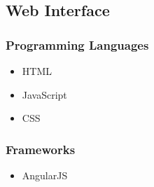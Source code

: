 \documentclass[a4paper,10pt]{article}
\begin{document}
\subsection{Web Interface}
\subsubsection{Programming Languages}
	\begin{itemize}
		\item HTML			
		\item JavaScript			
		\item CSS			
	\end{itemize}

\subsubsection{Frameworks}
	\begin{itemize}
		\item AngularJS
	\end{itemize}
\end{document}
